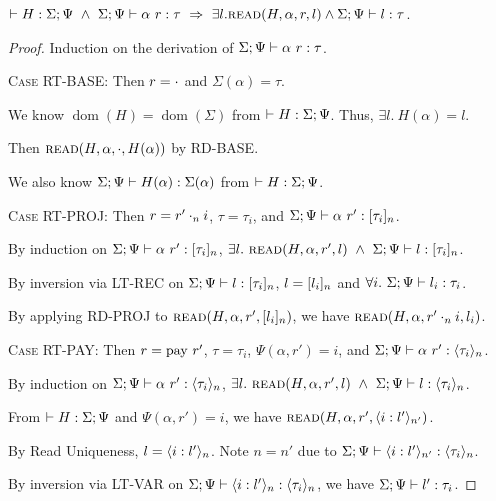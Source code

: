 \documentclass{article}
\DeclareMathOperator{\dom}{dom}
\begin{document}
\begin{lem}
  $\HWF{H}{\Sigma}{\Psi}\ \land\ \ARType{\Sigma}{\Psi}{\alpha}{r}{\tau}\ \Rightarrow\ 
  \exists l. \Read{H}{\alpha}{r}{l} \land \RTType{\Sigma}{\Psi}{l}{\tau}$.
\end{lem}

\begin{proof}
  Induction on the derivation of ${{{\Sigma}} ;{{\Psi}}} \vdash {{{\alpha}\ {r}}} : {{{\tau}}}$.
  
  \textsc{Case RT-BASE}:
    Then $r = \cdot$ and $\Sigma(\alpha) = \tau$.

    We know $\dom(H) = \dom(\Sigma)$ from $\vdash {H} : {\Sigma} ; {\Psi}$.
    Thus, $\exists l.\ H(\alpha) = l$.

    Then $\textsc{read}({H},{\alpha},{\cdot},{H(\alpha)})$ by \textsc{RD-BASE}.

    We also know ${{\Sigma} ;{\Psi}} \vdash {{H(\alpha)}} : {{\Sigma(\alpha)}}$ from $\vdash {H} : {\Sigma} ; {\Psi}$.

  \textsc{Case RT-PROJ}:
    Then $r = {r'}\cdot_{n} {i}$, $\tau = \tau_i$,
    and ${{{\Sigma}} ;{{\Psi}}} \vdash {{{\alpha}\ {r'}}} : {{{[ {\tau_i} ]_{n}}}}$.

    By induction on ${{{\Sigma}} ;{{\Psi}}} \vdash {{{\alpha}\ {r'}}} : {{{[ {\tau_i} ]_{n}}}}$,
    $\exists l.\ \Read{H}{\alpha}{r'}{l}\ \land\ \RTType{\Sigma}{\Psi}{l}{\Rec{\tau_i}{n}}$.

    By inversion via \textsc{LT-REC} on ${{\Sigma} ;{\Psi}} \vdash {{l}} : {{[ {\tau_i} ]_{n}}}$, 
    $l = [ {l_i} ]_{n}$ and $\forall i.\ \RTType{\Sigma}{\Psi}{l_i}{\tau_i}$.

    By applying \textsc{RD-PROJ} to $\textsc{read}({H},{\alpha},{r'},{[ {l_i} ]_{n}})$,
    we have $\textsc{read}({H},{\alpha},{{r'}\cdot_{n} {i}},{l_i})$.

  \textsc{Case RT-PAY}:
    Then $r = \textrm{pay}\ {r'}$, $\tau = \tau_i$, $\Psi(\alpha, r')=i$,
    and ${{{\Sigma}} ;{{\Psi}}} \vdash {{{\alpha}\ {r'}}} : {{{\langle {\tau_i} \rangle_{n}}}}$.

    By induction on ${{{\Sigma}} ;{{\Psi}}} \vdash {{{\alpha}\ {r'}}} : {{{\langle {\tau_i} \rangle_{n}}}}$,
    $\exists l.\ \Read{H}{\alpha}{r'}{l}\ \land\ \RTType{\Sigma}{\Psi}{l}{\Var{\tau_i}{n}}$.

    From $\vdash {H} : {\Sigma} ; {\Psi}$ and $\Psi(\alpha, r') = i$,
    we have $\textsc{read}({H},{\alpha},{r'},{\langle {i} : {l'} \rangle_{n'}})$.

    By Read Uniqueness, $l = \langle {i} : {l'} \rangle_{n}$.
    Note $n = n'$ due to ${{\Sigma} ;{\Psi}} \vdash {{\langle {i} : {l'} \rangle_{n'}}} : {{\langle {\tau_i} \rangle_{n}}}$.

    By inversion via \textsc{LT-VAR} on ${{\Sigma} ;{\Psi}} \vdash {{\langle {i} : {l'} \rangle_{n}}} : {{\langle {\tau_i} \rangle_{n}}}$,
    we have ${{\Sigma} ;{\Psi}} \vdash {{l'}} : {{\tau_i}}$.


\end{proof}
\end{document}
